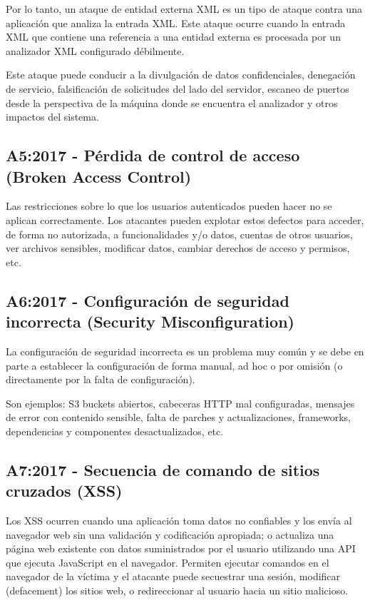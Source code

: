 Por lo tanto, un ataque de entidad externa XML es un tipo de ataque contra una aplicación que analiza 
la entrada XML. Este ataque ocurre cuando la entrada XML que contiene una referencia a una 
entidad externa es procesada por un analizador XML configurado débilmente. 

Este ataque puede conducir a la divulgación de datos confidenciales, denegación de servicio, falsificación 
de solicitudes del lado del servidor, escaneo de puertos desde la perspectiva de la máquina donde se 
encuentra el analizador y otros impactos del sistema.

\subsection{A5:2017 - Pérdida de control de acceso (Broken Access Control)}

Las restricciones sobre lo que los usuarios autenticados pueden hacer no se aplican
correctamente. Los atacantes pueden explotar estos defectos para acceder, de forma no
autorizada, a funcionalidades y/o datos, cuentas de otros usuarios, ver archivos sensibles,
modificar datos, cambiar derechos de acceso y permisos, etc. 

\subsection{A6:2017 - Configuración de seguridad incorrecta (Security Misconfiguration)}

La configuración de seguridad incorrecta es un problema muy común y se debe en parte a
establecer la configuración de forma manual, ad hoc o por omisión (o directamente por la falta de
configuración). 

Son ejemplos: S3 buckets abiertos, cabeceras HTTP mal configuradas, mensajes
de error con contenido sensible, falta de parches y actualizaciones, frameworks, dependencias y
componentes desactualizados, etc.

\subsection{A7:2017 - Secuencia de comando de sitios cruzados (XSS)}

Los XSS ocurren cuando una aplicación toma datos no confiables y los envía al navegador web
sin una validación y codificación apropiada; o actualiza una página web existente con datos
suministrados por el usuario utilizando una API que ejecuta JavaScript en el navegador. Permiten
ejecutar comandos en el navegador de la víctima y el atacante puede secuestrar una sesión,
modificar (defacement) los sitios web, o redireccionar al usuario hacia un sitio malicioso.


